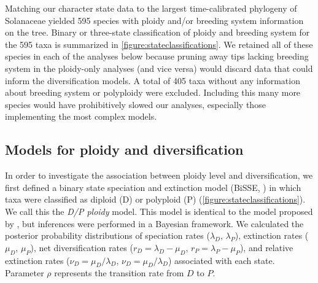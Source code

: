 Matching our character state data to the largest time-calibrated phylogeny of Solanaceae \citep{sarkinen_2013} yielded 595 species with ploidy and/or breeding system information on the tree.
Binary or three-state classification of ploidy and breeding system for the 595 taxa is summarized in \cref{figure:stateclassifications}.
We retained all of these species in each of the analyses below because pruning away tips lacking breeding system in the ploidy-only analyses (and vice versa) would discard data that could inform the diversification models.
A total of 405 taxa without any information about breeding system or polyploidy were excluded.
Including this many more species would have prohibitively slowed our analyses, especially those implementing the most complex models.



\subsection{Models for ploidy and diversification}

In order to investigate the association between ploidy level and diversification, we first defined a binary state speciation and extinction model (BiSSE, \citealt{maddison_2007}) in which taxa were classified as diploid (D) or polyploid (P) (\cref{figure:stateclassifications}).
We call this the \textit{D/P ploidy} model. This model is identical to the model proposed by \citet{mayrose_2011, mayrose_2015}, but inferences were performed in a Bayesian framework.
We calculated the posterior probability distributions of speciation rates ($\lambda_D$, $\lambda_P$), extinction rates ($\mu_D$, $\mu_P$), net diversification rates ($r_D=\lambda_D-\mu_D$, $r_P=\lambda_P-\mu_P$), and relative extinction rates ($\nu_D=\mu_D / \lambda_D$, $\nu_D=\mu_D / \lambda_D$) associated with each state. Parameter $\rho$ represents the transition rate from $D$ to $P$. %

